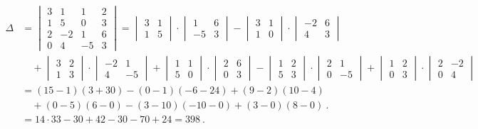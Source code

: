 \[
\begin{aligned}
\Delta &= \begin{vmatrix} 3 & 1 & 1 & 2 \\ 1 & 5 & 0 & 3 \\ 2 & -2 & 1 & 6 \\ 0 & 4 & -5 & 3 \end{vmatrix}
= \begin{vmatrix} 3 & 1 \\ 1 & 5 \end{vmatrix} \cdot \begin{vmatrix} 1 & 6 \\ -5 & 3 \end{vmatrix}
- \begin{vmatrix} 3 & 1 \\ 1 & 0 \end{vmatrix} \cdot \begin{vmatrix} -2 & 6 \\ 4 & 3 \end{vmatrix}\\
&\quad + \begin{vmatrix} 3 & 2 \\ 1 & 3 \end{vmatrix} \cdot \begin{vmatrix} -2 & 1 \\ 4 & -5 \end{vmatrix}
+ \begin{vmatrix} 1 & 1 \\ 5 & 0 \end{vmatrix} \cdot \begin{vmatrix} 2 & 6 \\ 0 & 3 \end{vmatrix}
- \begin{vmatrix} 1 & 2 \\ 5 & 3 \end{vmatrix} \cdot \begin{vmatrix} 2 & 1 \\ 0 & -5 \end{vmatrix}
+ \begin{vmatrix} 1 & 2 \\ 0 & 3 \end{vmatrix} \cdot \begin{vmatrix} 2 & -2 \\ 0 & 4 \end{vmatrix}\\
&= (15-1)(3+30) - (0-1)(-6-24) + (9-2)(10-4)\\
&\quad + (0-5)(6-0) - (3-10)(-10-0) + (3-0)(8-0)\ .\\
&= 14\cdot 33 - 30 + 42 - 30 - 70 + 24 = 398\ .
\end{aligned}
\]

